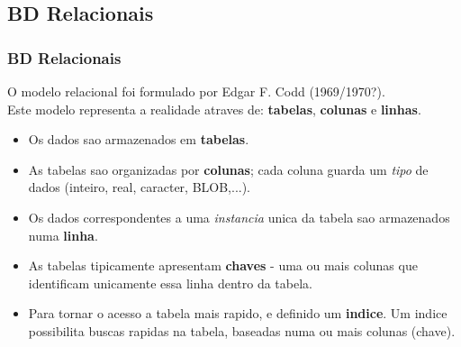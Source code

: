 \documentclass[hyperref={pdfpagelabels=true}]{beamer}
\begin{document}
\subsection{BD Relacionais}
\begin{frame}
\frametitle{BD Relacionais}
O modelo relacional foi formulado por Edgar F. Codd (1969/1970?).\\
Este modelo representa a realidade atraves de: \textbf{tabelas}, \textbf{colunas} e \textbf{linhas}.
  \begin{itemize}
  \item<2-> Os dados sao armazenados em \textbf{tabelas}.
  \item<3-> As tabelas sao organizadas por \textbf{colunas}; cada coluna guarda um \emph{tipo} de dados (inteiro, real, caracter, BLOB,...).  
  \item<4-> Os dados correspondentes a uma \textit{instancia} unica da tabela sao armazenados numa \textbf{linha}.
  \item<5-> As tabelas tipicamente apresentam \textbf{chaves} - uma ou mais colunas que identificam unicamente essa linha dentro da tabela.
  \item<6-> Para tornar o acesso a tabela mais rapido, e definido um \textbf{indice}. Um indice possibilita buscas rapidas na tabela, baseadas numa ou mais colunas (chave).
  \end{itemize}
\end{frame}
\end{document}
